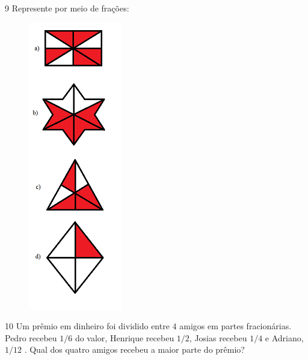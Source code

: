 {\num{9}  Represente por meio de frações:

\begin{figure}
\includegraphics[width=1.61458in,height=4.94792in]{./imgSAEB_6_MAT/media/image34.png}
\end{figure}

\begin{escolha}
\item {}
\item {}
\item {}
\item {}
\end{escolha}


\num{10} Um prêmio em dinheiro foi dividido entre $4$ amigos em partes
fracionárias. Pedro recebeu $1/6$ do valor, Henrique recebeu $1/2$, Josias
recebeu $1/4$ e Adriano, $1/12$ . Qual dos quatro amigos recebeu a maior
parte do prêmio?



}
